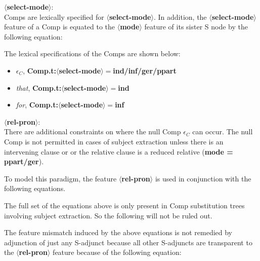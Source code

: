 {\bf $\langle$select-mode$\rangle$}:\\
Comps are lexically specified for {\bf $\langle$select-mode$\rangle$}.
In addition, the {\bf $\langle$select-mode$\rangle$} feature of a Comp
is equated to the {\bf $\langle$mode$\rangle$} feature of its
sister S node by the following equation:



The lexical specifications of the Comps are shown below:
\begin{itemize}
\item $\epsilon$$_{C}$, {\bf Comp.t:$\langle$select-mode$\rangle
=$ind/inf/ger/ppart}
\item {\em that}, {\bf Comp.t:$\langle$select-mode$\rangle =$ind}
\item {\em for}, {\bf Comp.t:$\langle$select-mode$\rangle =$inf}
\end{itemize}

{\bf $\langle$rel-pron$\rangle$}:\\
There are additional constraints on where the null Comp $\epsilon$$_{C}$
can occur. The null Comp is not permitted in cases of subject
extraction unless there is an intervening clause or or
the relative clause is a reduced relative ({\bf mode = ppart/ger}).

To model this paradigm, the feature {\bf $\langle$rel-pron$\rangle$} is used in
conjunction with the following equations.



The full set of the equations above is only present in Comp
substitution trees involving subject extraction. So the following will
not be ruled out.



The feature mismatch induced by the above equations
is not remedied by adjunction of just any S-adjunct
because all other S-adjuncts
are transparent to the {\bf $\langle$rel-pron$\rangle$} feature
because of the following equation:



